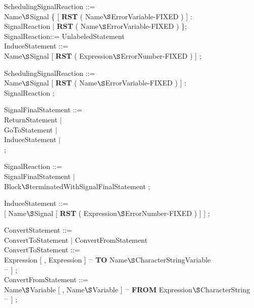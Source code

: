 \begin{removed}
SchedulingSignalReaction ::=\\
 Name$\S $Signal \{ [ {\bf RST} ( Name$\S $ErrorVariable-FIXED ) ] :\\
\x \x SignalReaction $\mid$ {\bf RST} ( Name$\S $ErrorVariable-FIXED ) \};\\

SignalReaction::= UnlabeledStatement\\

InduceStatement ::=\\
 Name$\S $Signal [ {\bf RST} ( Expression$\S $ErrorNumber-FIXED ) ] ;\\
\end{removed}
\begin{added}
SchedulingSignalReaction ::=\\
 Name$\S $Signal [ {\bf RST} ( Name$\S $ErrorVariable-FIXED ) ] :\\
\x \x SignalReaction ;

SignalFinalStatement ::= \\
\x ReturnStatement $\mid$ \\
\x GoToStatement $\mid$ \\
\x InduceStatement $\mid$ \\
 ;

SignalReaction ::=\\
\x SignalFinalStatement $\mid$ \\
\x Block$\S $terminatedWithSignalFinalStatement ;

InduceStatement ::=\\
 [ Name$\S $Signal [ {\bf RST} ( Expression$\S $ErrorNumber-FIXED ) ] ] ;\\
\end{added}

ConvertStatement ::=\\
\x ConvertToStatement $\mid$ ConvertFromStatement\\

ConvertToStatement ::= \\
 Expression [ , Expression ] $^{...}$ {\bf TO} Name$\S $CharacterStringVariable\\
\x [ {\bf BY} FormatOrPositionConvert [ , FormatOrPositionConvert ] $^{...}$ ] ;\\

ConvertFromStatement ::=\\
 Name$\S $Variable [ , Name$\S $Variable ] $^{...}$ {\bf FROM} Expression$\S $CharacterString\\
\x [ {\bf BY} FormatOrPositionConvert [ , FormatOrPositionConvert ] $^{...}$ ] ;\\


